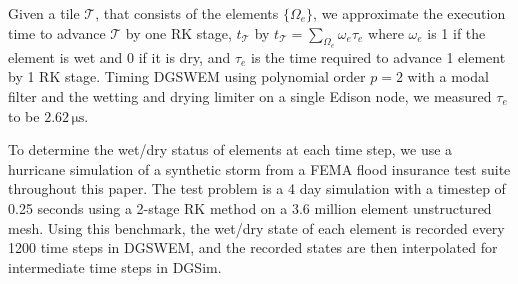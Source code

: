  Given a tile $\mathcal{T}$, that consists of the elements $\{\Omega_e\}$, we approximate the execution time to advance $\mathcal{T}$ by one RK stage, $t_{\mathcal{T}}$ by 
$t_{\mathcal{T}} = \sum_{\Omega_e} \omega_e \tau_e$ 
where $\omega_e$ is 1 if the element is wet and 0 if it is dry, and $\tau_e$ is the time required to advance 1 element by 1 RK stage.
Timing DGSWEM using polynomial order $p=2$ with a modal filter and the wetting and drying limiter on a single Edison node, we measured $\tau_e$ to be $2.62\,\mathrm{\mu s}$.

To determine the wet/dry status of elements at each time step, we use a hurricane simulation of a synthetic storm from a FEMA flood insurance test suite throughout this paper. The test problem is a 4 day simulation with a timestep of 0.25 seconds using a 2-stage RK method on a 3.6 million element unstructured mesh.
Using this benchmark, the wet/dry state of each element is recorded every 1200 time steps in DGSWEM, and the recorded states are then interpolated for intermediate time steps in DGSim.

